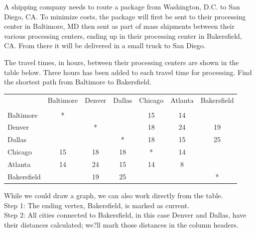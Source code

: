 \begin{example}{}{}
A shipping company needs to route a package from Washington, D.C. to San Diego, CA.  To minimize costs, the package will first be sent to their processing center in Baltimore, MD then sent as part of mass shipments between their various processing centers, ending up in their processing center in Bakersfield, CA.  From there it will be delivered in a small truck to San Diego.  

The travel times, in hours, between their processing centers are shown in the table below.  Three hours has been added to each travel time for processing.  Find the shortest path from Baltimore to Bakersfield.
 \begin{center}
 \begin{tabular}{|l|c|c|c|c|c|c|}
 \hline
 & Baltimore & Denver & Dallas & Chicago & Atlanta & Bakersfield\\
 &&&&&&\\
 \hline
 Baltimore & * &&&15&14&\\
 \hline
 Denver &&*&&18&24&19\\
 \hline
Dallas&&&*&18&15&25\\
 \hline
 Chicago &15&18&18&*&14&\\
 \hline
 Atlanta & 14 & 24&15&14&8&\\
 \hline
 Bakersfield &&19&25&&&*\\
 \hline
 \end{tabular}
 \end{center}


While we could draw a graph, we can also work directly from the table. \\

\noindent Step 1:  The ending vertex, Bakersfield, is marked as current.\\

\noindent Step 2:  All cities connected to Bakersfield, in this case Denver and Dallas, have their distances calculated; we?ll mark those distances in the column headers.  \\


\end{example}
